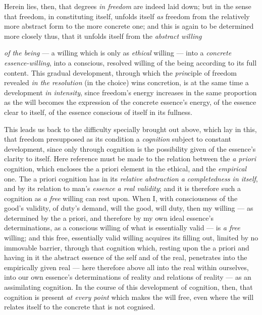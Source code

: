 \documentclass[12pt,a4paper]{book}
\begin{document}
Herein lies, then, that degrees \emph{in freedom} are indeed laid down; but in
the sense that freedom, in constituting itself, unfolds itself \emph{as}
freedom from the relatively more abstract form to the more concrete one; and
this is again to be determined more closely thus, that it unfolds itself from
the \emph{abstract willing}

\emph{of the being} --- a willing which is only as \emph{ethical} willing ---
into a \emph{concrete essence-willing}, into a conscious, resolved willing of
the being according to its full content. This gradual development, through
which the \emph{prin}ciple of freedom revealed \emph{in the resolution} (in the
choice) wins concretion, is at the same time a development \emph{in intensity},
since freedom's energy increases in the same proportion as the will becomes the
expression of the concrete essence's energy, of the essence clear to itself, of
the essence conscious of itself in its fullness.

This leads us back to the difficulty specially brought out above, which lay in
this, that freedom presupposed as its condition a \emph{cognition} subject to
constant development, since only through cognition is the possibility given of
the essence's clarity to itself. Here reference must be made to the relation
between the \emph{a priori} cognition, which encloses the a priori element in
the ethical, and the \emph{empirical} one. The a priori cognition has in its
\emph{relative abstraction a completedness in itself}, and by its relation to
man's \emph{essence a real validity}; and it is therefore such a cognition as
\emph{a free} willing can rest upon. When I, with consciousness of the good's
validity, of duty's demand, will the good, will duty, then my willing --- as
determined by the a priori, and therefore by my own ideal essence's
determinations, as a conscious willing of what is essentially valid --- is
\emph{a free} willing; and this free, essentially valid willing acquires its
filling out, limited by no immovable barrier, through that cognition which,
resting upon the a priori and having in it the abstract essence of the self and
of the real, penetrates into the empirically given real --- here therefore above
all into the real within ourselves, into our own essence's determinations of
reality and relations of reality --- as an assimilating cognition. In the course
of this development of cognition, then, that cognition is present \emph{at every
point} which makes the will free, even where the will relates itself to the
concrete that is not cognised.
\end{document}

